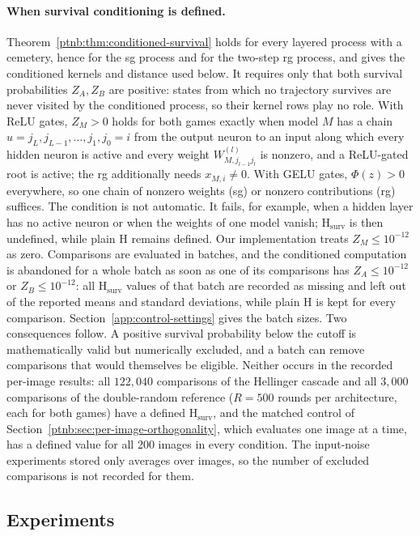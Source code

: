 \paragraph{When survival conditioning is defined.}
Theorem~\ref{ptnb:thm:conditioned-survival} holds for every layered process with a cemetery, hence for the \ac{sg} process and for the two-step \ac{rg} process, and gives the conditioned kernels and distance used below. It requires only that both survival probabilities $Z_A,Z_B$ are positive: states from which no trajectory survives are never visited by the conditioned process, so their kernel rows play no role. With ReLU gates, $Z_M>0$ holds for both games exactly when model $M$ has a chain $u=j_L,j_{L-1},\ldots,j_1,j_0=i$ from the output neuron to an input along which every hidden neuron is active and every weight $W^{(l)}_{M,j_{l-1}j_l}$ is nonzero, and a ReLU-gated root is active; the \ac{rg} additionally needs $x_{M,i}\neq0$. With GELU gates, $\Phi(z)>0$ everywhere, so one chain of nonzero weights (\ac{sg}) or nonzero contributions (\ac{rg}) suffices. The condition is not automatic. It fails, for example, when a hidden layer has no active neuron or when the weights of one model vanish; $\mathrm H_{\mathrm{surv}}$ is then undefined, while plain $\mathrm H$ remains defined. Our implementation treats $Z_M\le10^{-12}$ as zero. Comparisons are evaluated in batches, and the conditioned computation is abandoned for a whole batch as soon as one of its comparisons has $Z_A\le10^{-12}$ or $Z_B\le10^{-12}$: all $\mathrm H_{\mathrm{surv}}$ values of that batch are recorded as missing and left out of the reported means and standard deviations, while plain $\mathrm H$ is kept for every comparison. Section~\ref{app:control-settings} gives the batch sizes. Two consequences follow. A positive survival probability below the cutoff is mathematically valid but numerically excluded, and a batch can remove comparisons that would themselves be eligible. Neither occurs in the recorded per-image results: all $122{,}040$ comparisons of the Hellinger cascade and all $3{,}000$ comparisons of the double-random reference ($R=500$ rounds per architecture, each for both games) have a defined $\mathrm H_{\mathrm{surv}}$, and the matched control of Section~\ref{ptnb:sec:per-image-orthogonality}, which evaluates one image at a time, has a defined value for all 200 images in every condition. The input-noise experiments stored only averages over images, so the number of excluded comparisons is not recorded for them.

\subsection{Experiments}\label{ptnb:sec:lmp-experiments}

